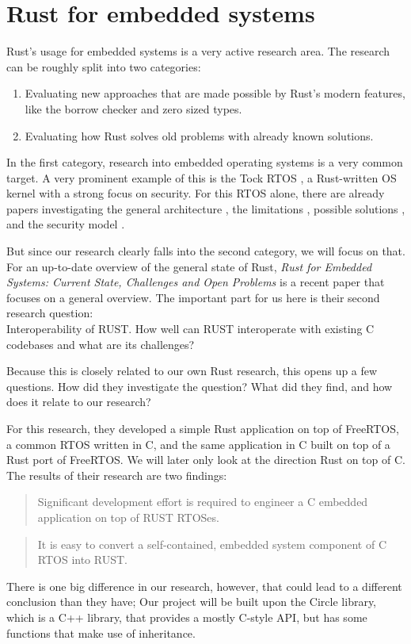 \section{Rust for embedded systems}

Rust's usage for embedded systems is a very active research area.
The research can be roughly split into two categories:
\begin{enumerate}
  \item Evaluating new approaches that are made possible by Rust's modern features, like the borrow checker and zero sized types.
  \item Evaluating how Rust solves old problems with already known solutions.
\end{enumerate}

In the first category, research into embedded operating systems is a very common target.
A very prominent example of this is the Tock RTOS \cite{tock}, a Rust-written OS kernel with a strong focus on security.
For this RTOS alone, there are already papers investigating the general architecture \cite{tock2}, the limitations \cite{theft}, possible solutions \cite{tock3}, and the security model \cite{tock4}.

But since our research clearly falls into the second category, we will focus on that.
For an up-to-date overview of the general state of Rust, \textit{Rust for Embedded Systems: Current State, Challenges and Open Problems} \cite{sharma2023rustembeddedsystemscurrent} is a recent paper that focuses on a general overview.
The important part for us here is their second research question:\\
Interoperability of RUST. How well can RUST interoperate with existing C codebases and what are its challenges?

Because this is closely related to our own Rust research, this opens up a few questions.
How did they investigate the question? What did they find, and how does it relate to our research?

For this research, they developed a simple Rust application on top of FreeRTOS,
a common RTOS written in C, and the same application in C built on top of a Rust port of FreeRTOS.
We will later only look at the direction Rust on top of C.
The results of their research are two findings:
\begin{quotation}
  Significant development effort is required to engineer a C embedded application on top of RUST RTOSes.
\end{quotation}
\begin{quotation}
  It is easy to convert a self-contained, embedded system component of C RTOS into RUST.
\end{quotation}

There is one big difference in our research, however, that could lead to a different conclusion than they have;
Our project will be built upon the Circle library, which is a C++ library, that provides a mostly C-style API,
but has some functions that make use of inheritance.